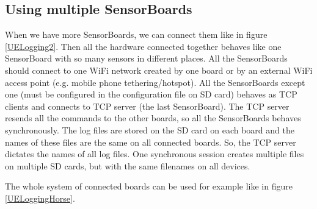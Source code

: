 \subsection{Using multiple SensorBoards}
When we have more SensorBoards, we can connect them like in figure \ref{UELogging2}. Then all the hardware connected together behaves like one SensorBoard with so many sensors in different places. All the SensorBoards should connect to one WiFi network created by one board or by an external WiFi access point (e.g. mobile phone tethering/hotspot). All the SensorBoards except one (must be configured in the configuration file on SD card) behaves as TCP clients and connects to TCP server (the last SensorBoard). The TCP server resends all the commands to the other boards, so all the SensorBoards behaves synchronously. The log files are stored on the SD card on each board and the names of these files are the same on all connected boards. So, the TCP server dictates the names of all log files. One synchronous session creates multiple files on multiple SD cards, but with the same filenames on all devices.

The whole system of connected boards can be used for example like in figure \ref{UELoggingHorse}.
